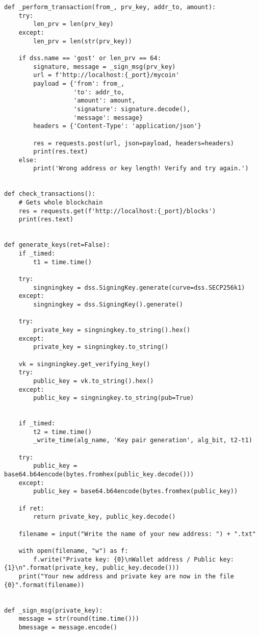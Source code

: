 \begin{lstlisting}
def _perform_transaction(from_, prv_key, addr_to, amount):
    try:
        len_prv = len(prv_key)
    except:
        len_prv = len(str(prv_key))

    if dss.name == 'gost' or len_prv == 64:
        signature, message = _sign_msg(prv_key)
        url = f'http://localhost:{_port}/mycoin'
        payload = {'from': from_,
                   'to': addr_to,
                   'amount': amount,
                   'signature': signature.decode(),
                   'message': message}
        headers = {'Content-Type': 'application/json'}

        res = requests.post(url, json=payload, headers=headers)
        print(res.text)
    else:
        print('Wrong address or key length! Verify and try again.')


def check_transactions():
    # Gets whole blockchain
    res = requests.get(f'http://localhost:{_port}/blocks')
    print(res.text)


def generate_keys(ret=False):
    if _timed:
        t1 = time.time()

    try:
        singningkey = dss.SigningKey.generate(curve=dss.SECP256k1)
    except:
        singningkey = dss.SigningKey().generate()

    try:
        private_key = singningkey.to_string().hex()
    except:
        private_key = singningkey.to_string()

    vk = singningkey.get_verifying_key()
    try:
        public_key = vk.to_string().hex()
    except:
        public_key = singningkey.to_string(pub=True)


    if _timed:
        t2 = time.time()
        _write_time(alg_name, 'Key pair generation', alg_bit, t2-t1)

    try:
        public_key = base64.b64encode(bytes.fromhex(public_key.decode()))
    except:
        public_key = base64.b64encode(bytes.fromhex(public_key))

    if ret:
        return private_key, public_key.decode()

    filename = input("Write the name of your new address: ") + ".txt"

    with open(filename, "w") as f:
        f.write("Private key: {0}\nWallet address / Public key: {1}\n".format(private_key, public_key.decode()))
    print("Your new address and private key are now in the file {0}".format(filename))


def _sign_msg(private_key):
    message = str(round(time.time()))
    bmessage = message.encode()


\end{lstlisting}
